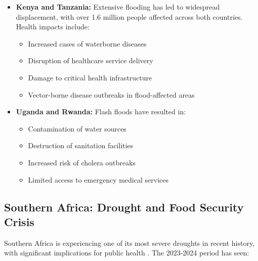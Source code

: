 \begin{itemize}
    \item \textbf{Kenya and Tanzania:} Extensive flooding has led to widespread displacement, with over 1.6 million people affected across both countries. Health impacts include:
    \begin{itemize}
        \item Increased cases of waterborne diseases
        \item Disruption of healthcare service delivery
        \item Damage to critical health infrastructure
        \item Vector-borne disease outbreaks in flood-affected areas
    \end{itemize}
    
    \item \textbf{Uganda and Rwanda:} Flash floods have resulted in:
    \begin{itemize}
        \item Contamination of water sources
        \item Destruction of sanitation facilities
        \item Increased risk of cholera outbreaks
        \item Limited access to emergency medical services
    \end{itemize}
\end{itemize}

\subsection{Southern Africa: Drought and Food Security Crisis}

Southern Africa is experiencing one of its most severe droughts in recent history, with significant implications for public health \citep{wfp2024drought}. The 2023-2024 period has seen:

